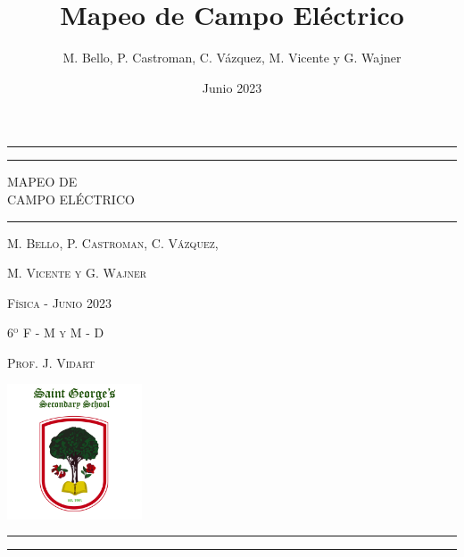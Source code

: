 \documentclass{article}
\title{Mapeo de Campo Eléctrico}
\author{M. Bello, P. Castroman, C. Vázquez, M. Vicente y G. Wajner}
\date{Junio 2023}
\begin{document}
\begin{titlepage}
	
	\centering
	
	\rule{\textwidth}{1pt}
	\vspace{2pt}\vspace{-\baselineskip}
	\rule{\textwidth}{0.4pt}

	\vspace{0.1\textheight}
	
	{\Huge MAPEO DE}\\[0.5\baselineskip]
	{\Huge CAMPO ELÉCTRICO}
	
	\vspace{0.025\textheight}
	
	\rule{0.3\textwidth}{0.4pt}
	
	\vspace{0.025\textheight}
	{\Large \textsc{M. Bello, P. Castroman, C. Vázquez,}}

  \vspace{0.1cm}

  {\Large \textsc{M. Vicente y G. Wajner}}

  \vfill
	
  \large\textsc{Física - Junio 2023}

  \vspace{-0.2cm}

  \large\textsc{6$^{\text{o}}$ F - M y M - D}

  \vspace{-0.2cm}

  \large\textsc{Prof. J. Vidart}

  \vspace{0.05\textheight}

	\includegraphics[width=0.3\textwidth]{logostgss-01.jpg}
	
  \vspace{0.1\textheight}

	\rule{\textwidth}{0.4pt}
	
	\vspace{2pt}\vspace{-\baselineskip}
	
	\rule{\textwidth}{1pt}
	
\end{titlepage}
\end{document}
